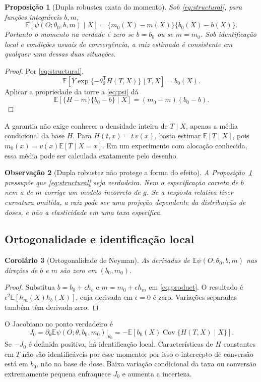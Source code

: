 \documentclass[11pt,a4paper]{article}
\newtheorem{theorem}{Proposição}[section]
\newtheorem{corollary}[theorem]{Corolário}
\newtheorem{remark}[theorem]{Observação}
\newcommand{\E}{\mathbb E}
\newcommand{\Cov}{\operatorname{Cov}}
\begin{document}
\begin{theorem}[Dupla robustez exata do momento]
\label{prop:dr}
Sob \eqref{eq:structural}, para funções integráveis $b,m$,
\begin{equation}
\boxed{\E[\psi(O;\theta_0,b,m)\mid X]
=\{m_0(X)-m(X)\}\{b_0(X)-b(X)\}.}
\label{eq:product}
\end{equation}
Portanto o momento na verdade é zero se $b=b_0$ ou se $m=m_0$. Sob identificação local e condições usuais de convergência, a raiz estimada é consistente em qualquer uma dessas duas situações.
\end{theorem}
\begin{proof}
Por \eqref{eq:structural},
\[
\E\left[Y\exp\{-\theta_0^{\mathsf T}H(T,X)\}\mid T,X\right]=b_0(X).
\]
Aplicar a propriedade da torre a \eqref{eq:psi} dá
\[
\E[\{H-m\}\{b_0-b\}\mid X]
=(m_0-m)(b_0-b).
\]
\end{proof}
A garantia não exige conhecer a densidade inteira de $T\mid X$, apenas a média condicional da base $H$. Para $H(t,x)=t\,v(x)$, basta estimar $\E[T\mid X]$, pois $m_0(x)=v(x)\E[T\mid X=x]$. Em um experimento com alocação conhecida, essa média pode ser calculada exatamente pelo desenho.

\begin{remark}[Dupla robustez não protege a forma do efeito]
A Proposição~\ref{prop:dr} pressupõe que \eqref{eq:structural} seja verdadeira. Nem a especificação correta de $b$ nem a de $m$ corrige um modelo incorreto de $g$. Se a resposta relativa tiver curvatura omitida, a raiz pode ser uma projeção dependente da distribuição de doses, e não a elasticidade em uma taxa específica.
\end{remark}

\subsection{Ortogonalidade e identificação local}
\begin{corollary}[Ortogonalidade de Neyman]
As derivadas de $\E\psi(O;\theta_0,b,m)$ nas direções de $b$ e $m$ são zero em $(b_0,m_0)$.
\end{corollary}
\begin{proof}
Substitua $b=b_0+\epsilon h_b$ e $m=m_0+\epsilon h_m$ em \eqref{eq:product}. O resultado é $\epsilon^2\E[h_m(X)h_b(X)]$, cuja derivada em $\epsilon=0$ é zero. Variações separadas também têm derivada zero.
\end{proof}
O Jacobiano no ponto verdadeiro é
\begin{equation}
J_0=\partial_\theta\E\psi(O;\theta,b_0,m_0)\big|_{\theta_0}
=-\E\left[b_0(X)\Cov\{H(T,X)\mid X\}\right].
\label{eq:jac}
\end{equation}
Se $-J_0$ é definida positiva, há identificação local. Características de $H$ constantes em $T$ não são identificáveis por esse momento; por isso o intercepto de conversão está em $b_0$, não na base de dose. Baixa variação condicional da taxa ou conversão extremamente pequena enfraquece $J_0$ e aumenta a incerteza.
\end{document}
